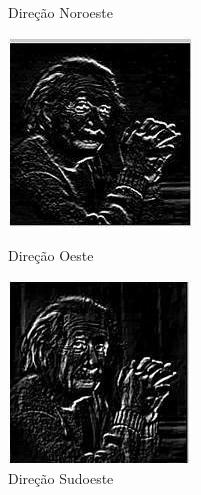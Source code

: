 \documentclass[a4paper, 12pt]{article}
\begin{document}
\begin{figure}[!htb]
	  	\caption{Direção Noroeste}
	\endminipage\hspace{1cm}
		\includegraphics[width=\linewidth]{images/robinson3.jpg}
		\caption{Direção Oeste}
  	\endminipage\hspace{1cm}
  		\includegraphics[width=\linewidth]{images/robinson4.jpg}
  		\caption{Direção Sudoeste}
	\endminipage
\end{figure}
\end{document}
